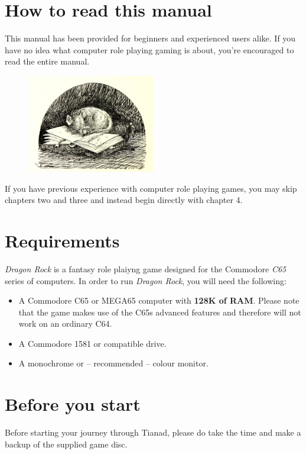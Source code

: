 \documentclass[12pt]{scrbook}
\begin{document}
\section*{How to read this manual}

This manual has been provided for beginners and experienced users alike. If you have no idea what computer role playing gaming is about, you're encouraged to read the entire manual. 

\begin{figure}[ht]
    \centering
    \includegraphics[width=0.5\textwidth]{illustrations/dormouse.jpg}
\end{figure}

If you have previous experience with computer role playing games, you may skip chapters two and three and instead begin directly with chapter 4. 


\section*{Requirements}
\textit{Dragon Rock} is a fantasy role plaiyng game designed for the Commodore \textit{C65} series of computers. In order to run \textit{Dragon Rock}, you will need the following:
\begin{itemize}
    \item A Commodore C65 or MEGA65 computer with \textbf{128K of RAM}. Please note that the game makes use of the C65s advanced features and therefore will not work on an ordinary C64.
    \item A Commodore 1581 or compatible drive.
    \item A monochrome or -- recommended -- colour monitor.
\end{itemize}

\section*{Before you start}
Before starting your journey through Tianad, please do take the time and make a backup of the supplied game disc.
\end{document}

